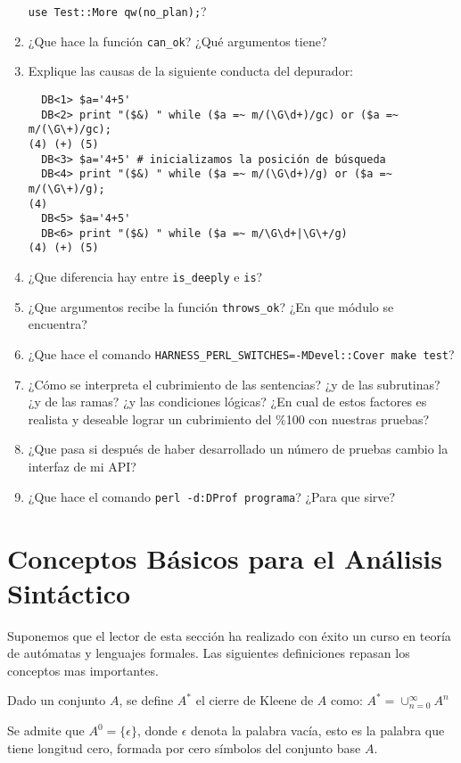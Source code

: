 \begin{enumerate}
\verb|use Test::More qw(no_plan);|?
\item
¿Que hace la función \verb|can_ok|? ¿Qué argumentos tiene?
\item
Explique las causas de la siguiente conducta del depurador:
\begin{verbatim}
  DB<1> $a='4+5'
  DB<2> print "($&) " while ($a =~ m/(\G\d+)/gc) or ($a =~ m/(\G\+)/gc);
(4) (+) (5)
  DB<3> $a='4+5' # inicializamos la posición de búsqueda
  DB<4> print "($&) " while ($a =~ m/(\G\d+)/g) or ($a =~ m/(\G\+)/g);
(4)
  DB<5> $a='4+5'
  DB<6> print "($&) " while ($a =~ m/\G\d+|\G\+/g)
(4) (+) (5)
\end{verbatim}
\item
¿Que diferencia hay entre \verb|is_deeply| e \verb|is|?

\item
¿Que argumentos recibe la función \verb|throws_ok|?
¿En que módulo se encuentra?

\item
¿Que hace el comando
\verb|HARNESS_PERL_SWITCHES=-MDevel::Cover make test|?

\item
¿Cómo se interpreta el cubrimiento de las sentencias? ¿y de las subrutinas?
¿y de las ramas? ¿y las condiciones lógicas?
¿En cual de estos factores es realista y deseable lograr un cubrimiento
del \%100 con nuestras pruebas?

\item
¿Que pasa si después de haber desarrollado un número de pruebas
cambio la interfaz de mi API?

\item
¿Que hace el comando \verb|perl -d:DProf programa|? ¿Para que sirve?
\end{enumerate}

\section{Conceptos Básicos para el Análisis Sintáctico}
\label{section:conceptos}
Suponemos que el lector de esta sección ha realizado con éxito
un curso en teoría de autómatas y lenguajes formales.
Las siguientes definiciones repasan los conceptos mas importantes.

\begin{definition}
Dado un conjunto $A$, se define $A^*$ el cierre de Kleene de $A$ como:
\begin{math}
A^* = \cup_{n=0}^{\infty} A^n
\end{math}

Se admite que $A^0 = \{ \epsilon \}$, donde $\epsilon$ denota la palabra vacía, esto es
la palabra que tiene longitud cero, formada por cero símbolos del conjunto base $A$.
\end{definition}

